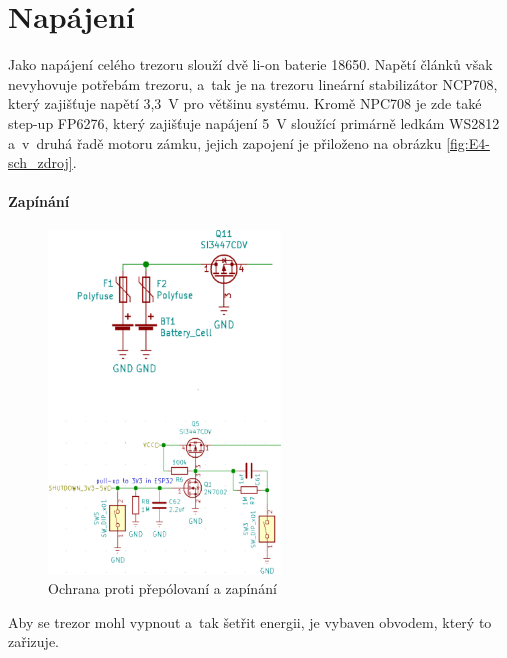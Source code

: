 \section{Napájení}

Jako napájení celého trezoru slouží dvě li-on baterie 18650. Napětí článků však nevyhovuje potřebám trezoru, a~tak je na trezoru lineární 
stabilizátor NCP708, který zajišťuje napětí 3,3~V pro většinu systému. Kromě NPC708 je zde také step-up FP6276, který zajišťuje napájení 5~V 
sloužící primárně ledkám WS2812 a~v~druhá řadě motoru zámku, jejich zapojení je přiloženo na obrázku \ref{fig:E4-sch_zdroj}.

\paragraph*{Zapínání}

\begin{figure}
    \centering
    \includegraphics[width=0.55\textwidth]{kapitoly/obrazky/E4/napajeni/ochrana_proti_prepolovani_a_zapinani.png}
    \caption{\label{fig:frog1}Ochrana proti přepólovaní a zapínání}
\end{figure} %
Aby se trezor mohl vypnout a~tak šetřit energii, je vybaven obvodem, který to zařizuje.

